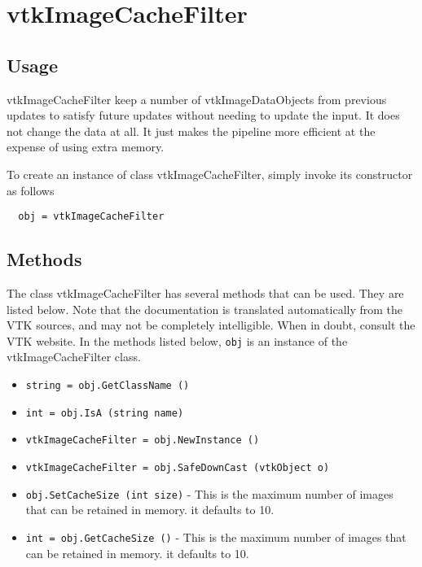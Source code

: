 \section{vtkImageCacheFilter}

\subsection{Usage}

 vtkImageCacheFilter keep a number of vtkImageDataObjects from previous
 updates to satisfy future updates without needing to update the input.  It
 does not change the data at all.  It just makes the pipeline more
 efficient at the expense of using extra memory.

To create an instance of class vtkImageCacheFilter, simply
invoke its constructor as follows
\begin{verbatim}
  obj = vtkImageCacheFilter
\end{verbatim}
\subsection{Methods}

The class vtkImageCacheFilter has several methods that can be used.
  They are listed below.
Note that the documentation is translated automatically from the VTK sources,
and may not be completely intelligible.  When in doubt, consult the VTK website.
In the methods listed below, \verb|obj| is an instance of the vtkImageCacheFilter class.
\begin{itemize}
\item  \verb|string = obj.GetClassName ()|

\item  \verb|int = obj.IsA (string name)|

\item  \verb|vtkImageCacheFilter = obj.NewInstance ()|

\item  \verb|vtkImageCacheFilter = obj.SafeDownCast (vtkObject o)|

\item  \verb|obj.SetCacheSize (int size)| -  This is the maximum number of images that can be retained in memory.
 it defaults to 10.

\item  \verb|int = obj.GetCacheSize ()| -  This is the maximum number of images that can be retained in memory.
 it defaults to 10.

\end{itemize}
